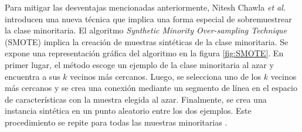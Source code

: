 Para mitigar las desventajas mencionadas anteriormente, Nitesh Chawla \emph{et al.} \citep{CITE:37} 
introducen una nueva técnica que implica una forma especial 
de sobremuestrear la clase minoritaria. El algoritmo 
\emph{Synthetic Minority Over-sampling Technique} (SMOTE) implica la creación de muestras sintéticas de 
la clase minoritaria. Se expone una representación gráfica del algoritmo en la figura \ref{fig:SMOTE}. 
En primer lugar, el método escoge un ejemplo de la clase minoritaria al azar y encuentra a sus $k$ vecinos 
más cercanos. Luego, se selecciona uno de los $k$ vecinos más cercanos y se crea una conexión mediante 
un segmento de línea en el espacio de características con la muestra elegida al azar. Finalmente, se crea 
una instancia sintética en un punto aleatorio entre los dos ejemplos. Este procedimiento se repite para
todas las muestras minoritarias \citep{CITE:38}. 

